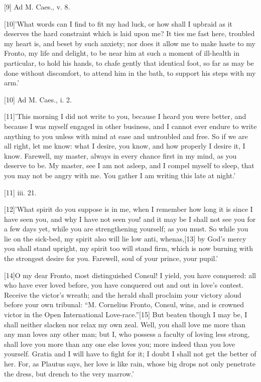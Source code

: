 [9]
Ad M. Caes., v. 8.

[10]'What
words can I find to fit my had luck, or how shall I upbraid as it
deserves the hard constraint which is laid upon me? It ties me fast here,
troubled my heart is, and beset by such anxiety; nor does it allow me to
make haste to my Fronto, my life and delight, to be near him at such a
moment of ill-health in particular, to hold his hands, to chafe gently
that identical foot, so far as may be done without discomfort, to attend
him in the bath, to support his steps with my arm.'

[10]
Ad M. Caes., i. 2.

[11]'This
morning I did not write to you, because I heard you were better, and
because I was myself engaged in other business, and I cannot ever endure
to write anything to you unless with mind at ease and untroubled and
free. So if we are all right, let me know: what I desire, you know, and
how properly I desire it, I know. Farewell, my master, always in every
chance first in my mind, as you deserve to be. My master, see I am not
asleep, and I compel myself to sleep, that you may not be angry with me.
You gather I am writing this late at night.'

[11]
iii. 21.

[12]'What
spirit do you suppose is in me, when I remember how long it is since I
have seen you, and why I have not seen you! and it may be I shall not
see you for a few days yet, while you are strengthening yourself; as you
must. So while you lie on the sick-bed, my spirit also will lie low anti,
whenas,[13]
by God's mercy you shall stand upright, my spirit too will stand firm,
which is now burning with the strongest desire for you. Farewell, soul of
your prince, your pupil.'

[14]O
my dear Fronto, most distinguished Consul! I yield, you have conquered:
all who have ever loved before, you have conquered out and out in love's
contest. Receive the victor's wreath; and the herald shall proclaim your
victory aloud before your own tribunal: ``M. Cornelius Fronto, Consul,
wins, and is crowned victor in the Open International
Love-race.''[15]
But beaten though I may be, I shall neither slacken nor relax my own
zeal. Well, you shall love me more than any man loves any other man; but
I, who possess a faculty of loving less strong, shall love you more than
any one else loves you; more indeed than you love yourself. Gratia and I
will have to fight for it; I doubt I shall not get the better of her.
For, as Plautus says, her love is like rain, whose big drops not only
penetrate the dress, but drench to the very marrow.'

